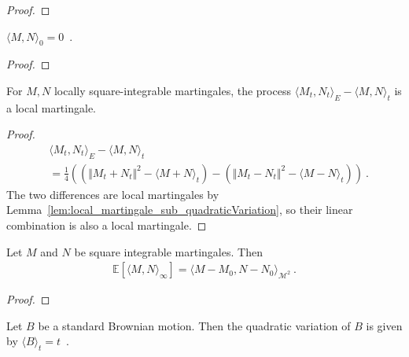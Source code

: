 \begin{proof}

\end{proof}


\begin{lemma}\label{lem:covariation_zero}
$\langle M, N \rangle_0 = 0$~.
\end{lemma}

\begin{proof}

\end{proof}


\begin{lemma}\label{lem:local_martingale_sub_covariation}
For $M, N$ locally square-integrable martingales, the process
$\langle M_t, N_t \rangle_E - \langle M, N \rangle_t$ is a local martingale.
\end{lemma}

\begin{proof}
\begin{align*}
  &\langle M_t, N_t \rangle_E - \langle M, N \rangle_t
  \\
  &= \frac{1}{4}\left( \left(\Vert M_t + N_t \Vert^2 - \langle M+N \rangle_t\right) - \left(\Vert M_t - N_t \Vert^2 - \langle M-N \rangle_t\right) \right)
  \: .
\end{align*}
The two differences are local martingales by Lemma~\ref{lem:local_martingale_sub_quadraticVariation}, so their linear combination is also a local martingale.
\end{proof}


\begin{lemma}\label{lem:covariation_eq_inner}
Let $M$ and $N$ be square integrable martingales. Then
\begin{align*}
  \mathbb{E}\left[\langle M,N \rangle_\infty\right] = \langle M - M_0, N - N_0 \rangle_{\mathcal{M}^2}
  \: .
\end{align*}
\end{lemma}

\begin{proof}

\end{proof}


\begin{lemma}\label{lem:quadraticVariation_brownian}
Let $B$ be a standard Brownian motion. Then the quadratic variation of $B$ is given by $\langle B \rangle_t = t$~.
\end{lemma}

